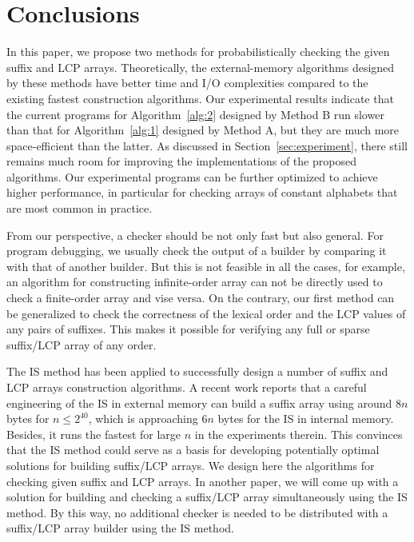 \documentclass[10pt,journal,compsoc]{IEEEtran}
\begin{document}
\section{Conclusions} \label{sec:conclusion}

In this paper, we propose two methods for probabilistically checking the given suffix and LCP arrays. Theoretically, the external-memory algorithms designed by these methods have better time and I/O complexities compared to the existing fastest construction algorithms. Our experimental results indicate that the current programs for Algorithm~\ref{alg:2} designed by Method B run slower than that for Algorithm~\ref{alg:1} designed by Method A, but they are much more space-efficient than the latter. As discussed in Section~\ref{sec:experiment}, there still remains much room for improving the implementations of the proposed algorithms. Our experimental programs can be further optimized to achieve higher performance, in particular for checking arrays of constant alphabets that are most common in practice. {\color{red}{The optimized programs will run much faster and use at most $n$ integers as the working space in addition to the input arrays.}  }


From our perspective, a checker should be not only fast but also general. For program debugging, we usually check the output of a builder by comparing it with that of another builder. But this is not feasible in all the cases, for example, an algorithm for constructing infinite-order array can not be directly used to check a finite-order array and vise versa. On the contrary, our first method can be generalized to check the correctness of the lexical order and the LCP values of any pairs of suffixes. This makes it possible for verifying any full or sparse suffix/LCP array of any order.

The IS method has been applied to successfully design a number of suffix and LCP arrays construction algorithms. A recent work \cite{Karkkainen2017} reports that a careful engineering of the IS in external memory can build a suffix array using around $8n$ bytes for $n\le 2^{40}$, which is approaching $6n$ bytes for the IS in internal memory. Besides, it runs the fastest for large $n$ in the experiments therein. This convinces that the IS method could serve as a basis for developing potentially optimal solutions for building suffix/LCP arrays. We design here the algorithms for checking given suffix and LCP arrays. In another paper, we will come up with a solution for building and checking a suffix/LCP array simultaneously using the IS method. By this way, no additional checker is needed to be distributed with a suffix/LCP array builder using the IS method.
\end{document}

